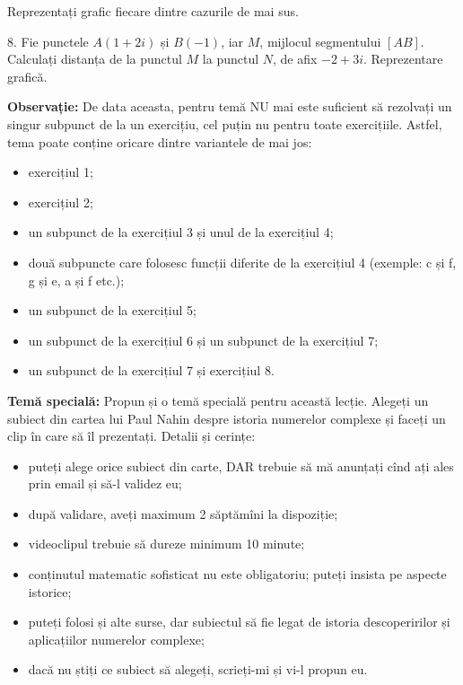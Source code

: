 Reprezentați grafic fiecare dintre cazurile de mai sus.

\vspace{0.3cm}

8. Fie punctele $ A(1 + 2i) $ și $ B(-1) $, iar $ M $, mijlocul
segmentului $ [AB] $. Calculați distanța de la punctul $ M $
la punctul $ N $, de afix $ -2 + 3i $. Reprezentare grafică.

\vspace{0.3cm}

\textbf{Observație:} De data aceasta, pentru temă NU mai este suficient să
rezolvați un singur subpunct de la un exercițiu, cel puțin nu pentru toate
exercițiile. Astfel, tema poate conține oricare dintre variantele de mai jos:
\begin{itemize}
\item exercițiul 1;
\item exercițiul 2;
\item un subpunct de la exercițiul 3 și unul de la exercițiul 4;
\item două subpuncte care folosesc funcții diferite de la exercițiul 4
  (exemple: c și f, g și e, a și f etc.);
\item un subpunct de la exercițiul 5;
\item un subpunct de la exercițiul 6 și un subpunct de la exercițiul 7;
\item un subpunct de la exercițiul 7 și exercițiul 8.
\end{itemize}

\newpage

\textbf{Temă specială:} Propun și o temă specială pentru această lecție.
Alegeți un subiect din cartea lui Paul Nahin despre istoria numerelor complexe
și faceți un clip în care să îl prezentați. Detalii și cerințe:
\begin{itemize}
\item puteți alege orice subiect din carte, DAR trebuie să mă anunțați cînd ați
  ales prin email și să-l validez eu;
\item după validare, aveți maximum 2 săptămîni la dispoziție;
\item videoclipul trebuie să dureze minimum 10 minute;
\item conținutul matematic sofisticat nu este obligatoriu; puteți insista pe aspecte
  istorice;
\item puteți folosi și alte surse, dar subiectul să fie legat de istoria descoperirilor
  și aplicațiilor numerelor complexe;
\item dacă nu știți ce subiect să alegeți, scrieți-mi și vi-l propun eu.
\end{itemize}

